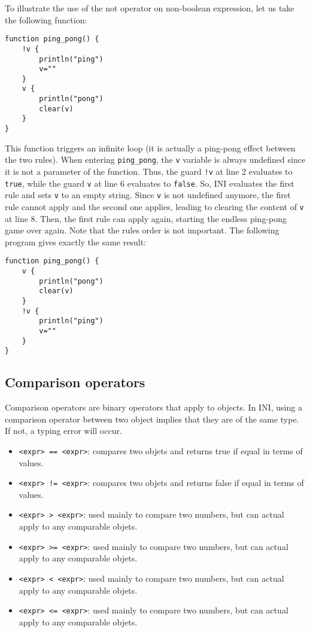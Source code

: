 \documentclass[11pt]{report}
\begin{document}
To illustrate the use of the not operator on non-boolean expression, let us take the following function:

\begin{lstlisting}
function ping_pong() {
	!v {
		println("ping")
		v=""
	}
	v {
		println("pong")
		clear(v)
	}
}
\end{lstlisting}

This function triggers an infinite loop (it is actually a ping-pong effect between the two rules). When entering \texttt{ping\_pong}, the \texttt{v} variable is always undefined since it is not a parameter of the function. Thus, the guard \texttt{!v} at line 2 evaluates to \texttt{true}, while the guard \texttt{v} at line 6 evaluates to \texttt{false}. So, INI evaluates the first rule and sets \texttt{v} to an empty string. Since \texttt{v} is not undefined anymore, the first rule cannot apply and the second one applies, leading to clearing the content of \texttt{v} at line 8. Then, the first rule can apply again, starting the endless ping-pong game over again. Note that the rules order is not important. The following program gives exactly the same result:

\begin{lstlisting}
function ping_pong() {
	v {
		println("pong")
		clear(v)
	}
	!v {
		println("ping")
		v=""
	}
}
\end{lstlisting}

\subsection{Comparison operators}

Comparison operators are binary operators that apply to objects. In INI, using a comparison operator between two object implies that they are of the same type. If not, a typing error will occur.

\begin{itemize}
\item \texttt{<expr> == <expr>}: compares two objets and returns true if equal in terms of values.
\item \texttt{<expr> != <expr>}: compares two objets and returns false if equal in terms of values.
\item \texttt{<expr> > <expr>}: used mainly to compare two numbers, but can actual apply to any comparable objets.
\item \texttt{<expr> >= <expr>}: used mainly to compare two numbers, but can actual apply to any comparable objets.
\item \texttt{<expr> < <expr>}: used mainly to compare two numbers, but can actual apply to any comparable objets.
\item \texttt{<expr> <= <expr>}: used mainly to compare two numbers, but can actual apply to any comparable objets.
\end{itemize}
\end{document}
